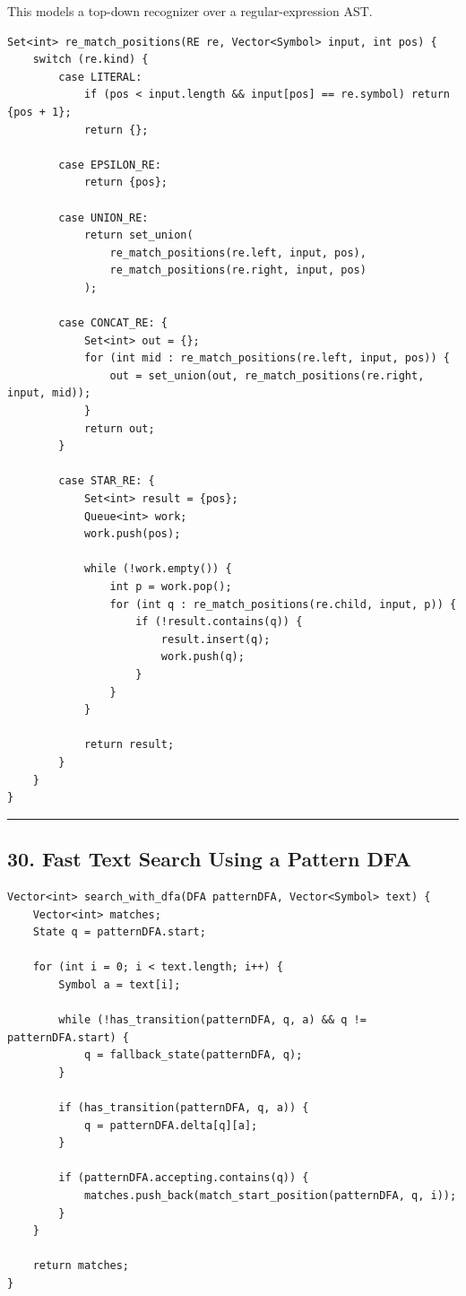 \documentclass[10pt,letterpaper]{article}
\begin{document}
This models a top-down recognizer over a regular-expression AST.

\begin{verbatim}
Set<int> re_match_positions(RE re, Vector<Symbol> input, int pos) {
    switch (re.kind) {
        case LITERAL:
            if (pos < input.length && input[pos] == re.symbol) return {pos + 1};
            return {};

        case EPSILON_RE:
            return {pos};

        case UNION_RE:
            return set_union(
                re_match_positions(re.left, input, pos),
                re_match_positions(re.right, input, pos)
            );

        case CONCAT_RE: {
            Set<int> out = {};
            for (int mid : re_match_positions(re.left, input, pos)) {
                out = set_union(out, re_match_positions(re.right, input, mid));
            }
            return out;
        }

        case STAR_RE: {
            Set<int> result = {pos};
            Queue<int> work;
            work.push(pos);

            while (!work.empty()) {
                int p = work.pop();
                for (int q : re_match_positions(re.child, input, p)) {
                    if (!result.contains(q)) {
                        result.insert(q);
                        work.push(q);
                    }
                }
            }

            return result;
        }
    }
}
\end{verbatim}

\medskip\hrule\medskip

\subsection*{30. Fast Text Search Using a Pattern DFA}

\begin{verbatim}
Vector<int> search_with_dfa(DFA patternDFA, Vector<Symbol> text) {
    Vector<int> matches;
    State q = patternDFA.start;

    for (int i = 0; i < text.length; i++) {
        Symbol a = text[i];

        while (!has_transition(patternDFA, q, a) && q != patternDFA.start) {
            q = fallback_state(patternDFA, q);
        }

        if (has_transition(patternDFA, q, a)) {
            q = patternDFA.delta[q][a];
        }

        if (patternDFA.accepting.contains(q)) {
            matches.push_back(match_start_position(patternDFA, q, i));
        }
    }

    return matches;
}
\end{verbatim}
\end{document}
